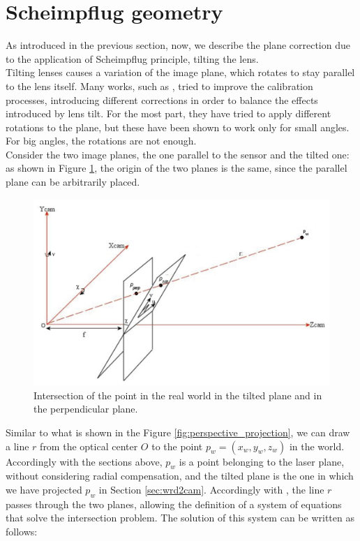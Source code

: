 \section{Scheimpflug geometry}
\label{sec:scheimflug}
As introduced in the previous section, now, we describe the plane correction due to the application of Scheimpflug principle, tilting the lens. \\

Tilting lenses causes a variation of the image plane, which rotates to stay parallel to the lens itself. Many works, such as \cite{inproc-lens-inc}\cite{Louhichi2006}\cite{4059344}, tried to improve the calibration processes, introducing different corrections in order to balance the effects introduced by lens tilt. For the most part, they have tried to apply different rotations to the plane, but these have been shown to work only for small angles. For big angles, the rotations are not enough. \\

Consider the two image planes, the one parallel to the sensor and the tilted one: as shown in Figure \ref{fig:scheimpflug-line}, the origin of the two planes is the same, since the parallel plane can be arbitrarily placed.
  \begin{figure}[t!]
    \centering
    \includegraphics[width=\textwidth]{./images/model/scheimpflug.png}
    \caption{Intersection of the point in the real world in the tilted plane and in the perpendicular plane.}
    \label{fig:scheimpflug-line}
  \end{figure}
Similar to what is shown in the Figure \ref{fig:perspective_projection}, we can draw a line $r$ from the optical center $O$ to the point $p_w = \left( x_w, y_w, z_w \right)$ in the world. Accordingly with the sections above, $p_w$ is a point belonging to the laser plane, without considering radial compensation, and the tilted plane is the one in which we have projected $p_w$ in Section \ref{sec:wrd2cam}. Accordingly with \cite{SchCameraCalib}, the line $r$ passes through the two planes, allowing the definition of a system of equations that solve the intersection problem. The solution of this system can be written as follows:

